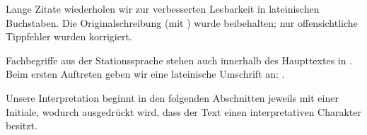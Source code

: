 Lange Zitate wiederholen wir zur verbesserten Lesbarkeit in lateinischen Buchstaben. Die Originalschreibung (mit ) wurde beibehalten; nur offensichtliche Tippfehler wurden korrigiert. 

Fachbegriffe aus der Stationssprache stehen auch innerhalb des Haupttextes in . Beim ersten Auftreten geben wir eine lateinische Umschrift an: . 

Unsere Interpretation beginnt in den folgenden Abschnitten jeweils mit einer Initiale, wodurch ausgedrückt wird, dass der Text einen interpretativen Charakter besitzt.



